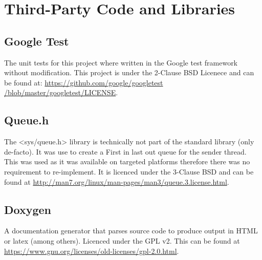 \chapter{Third-Party Code and Libraries}

\section*{Google Test}
The unit tests for this project where written in the Google test framework\cite{google_tests} without modification. This project is under the 2-Clause BSD Licenece and can be found at: \url{https://github.com/google/googletest /blob/master/googletest/LICENSE}.

\section*{Queue.h}
The <sys/queue.h> library is technically not part of the standard library (only de-facto). It was use to create a First in last out queue for the sender thread. This was used as it was available on targeted platforms therefore there was no requirement to re-implement. It is licenced under the 3-Clause BSD and can be found at \url{http://man7.org/linux/man-pages/man3/queue.3.license.html}.

\section*{Doxygen}
A documentation generator that parses source code to produce output in HTML or latex (among others). Licenced under the GPL v2. This can be found at \url{https://www.gnu.org/licenses/old-licenses/gpl-2.0.html}.
